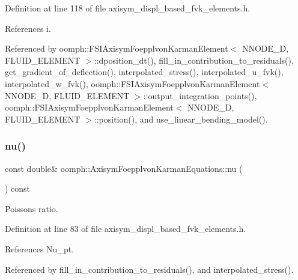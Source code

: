 Definition at line 118 of file axisym\+\_\+displ\+\_\+based\+\_\+fvk\+\_\+elements.\+h.



References i.



Referenced by oomph\+::\+F\+S\+I\+Axisym\+Foepplvon\+Karman\+Element$<$ N\+N\+O\+D\+E\+\_\+D, F\+L\+U\+I\+D\+\_\+\+E\+L\+E\+M\+E\+N\+T $>$\+::dposition\+\_\+dt(), fill\+\_\+in\+\_\+contribution\+\_\+to\+\_\+residuals(), get\+\_\+gradient\+\_\+of\+\_\+deflection(), interpolated\+\_\+stress(), interpolated\+\_\+u\+\_\+fvk(), interpolated\+\_\+w\+\_\+fvk(), oomph\+::\+F\+S\+I\+Axisym\+Foepplvon\+Karman\+Element$<$ N\+N\+O\+D\+E\+\_\+D, F\+L\+U\+I\+D\+\_\+\+E\+L\+E\+M\+E\+N\+T $>$\+::output\+\_\+integration\+\_\+points(), oomph\+::\+F\+S\+I\+Axisym\+Foepplvon\+Karman\+Element$<$ N\+N\+O\+D\+E\+\_\+D, F\+L\+U\+I\+D\+\_\+\+E\+L\+E\+M\+E\+N\+T $>$\+::position(), and use\+\_\+linear\+\_\+bending\+\_\+model().

\mbox{\label{classoomph_1_1AxisymFoepplvonKarmanEquations_af9e39f4e7643aaecc50d3535ac976f35}} 
\subsubsection{\texorpdfstring{nu()}{nu()}}
{\footnotesize\ttfamily const double\& oomph\+::\+Axisym\+Foepplvon\+Karman\+Equations\+::nu (\begin{DoxyParamCaption}{ }\end{DoxyParamCaption}) const\hspace{0.3cm}{\ttfamily [inline]}}



Poisson\textquotesingle{}s ratio. 



Definition at line 83 of file axisym\+\_\+displ\+\_\+based\+\_\+fvk\+\_\+elements.\+h.



References Nu\+\_\+pt.



Referenced by fill\+\_\+in\+\_\+contribution\+\_\+to\+\_\+residuals(), and interpolated\+\_\+stress().

\mbox{\label{classoomph_1_1AxisymFoepplvonKarmanEquations_a10ca08ff9306d643f6ffb0f644ab2cbc}} 
